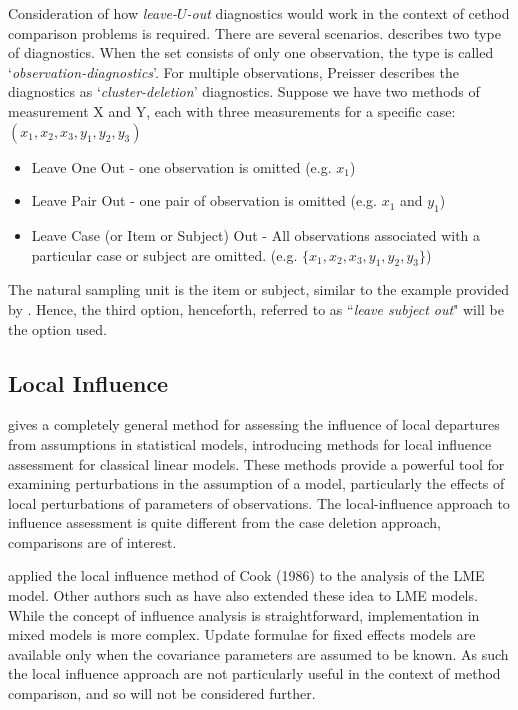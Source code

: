 \documentclass[12pt, a4paper]{report}
\theoremstyle{plain}
\theoremstyle{definition}
\theoremstyle{remark}
\begin{document}
Consideration of how \textit{leave-$U$-out} diagnostics would work in the context of cethod comparison problems is required. There are several scenarios. \citet{preisser} describes two type of diagnostics. When the set consists of only one observation, the type is called `\textit{observation-diagnostics}'. For multiple observations, Preisser describes the diagnostics as `\textit{cluster-deletion}' diagnostics. Suppose we have two methods of measurement X and Y, each with three measurements for a specific case: $(x_1,x_2,x_3,y_1,y_2,y_3)$
	
	\begin{itemize}
		\item Leave One Out - one observation is omitted (e.g. $x_1$)
		\item Leave Pair Out - one pair of observation  is omitted (e.g. $x_1$ and $y_1$)
		\item Leave Case (or Item or Subject) Out - All observations associated with a particular case or subject are omitted. (e.g. $\{x_1,x_2,x_3,y_1,y_2,y_3\}$)
	\end{itemize}
	
	The natural sampling unit is the item or subject, similar to the example provided by \citet{schabenberger}. Hence, the third option, henceforth, referred to as ``\textit{leave subject out}" will be the option used.
	

	
\subsection{Local Influence}
\citet{cook86} gives a completely general method for assessing the influence of local departures from assumptions in statistical models, introducing methods for local influence assessment for classical linear models. These methods provide a powerful tool for examining perturbations in the assumption of a model, particularly the effects of local perturbations of parameters of observations. The local-influence approach to influence assessment is quite different from the case deletion approach, comparisons are of interest.

\citet{Beckman} applied the local influence method of Cook (1986) to the analysis of the LME model.  Other authors such as \citet{lesaffre1998local} have also extended these idea to LME models. 
While the concept of influence analysis is straightforward, implementation in mixed models is more complex. Update formulae for fixed effects models are available only when the covariance parameters are assumed to be known. As such the local influence approach are not particularly useful in the context of method comparison, and so will not be considered further.
\end{document}
